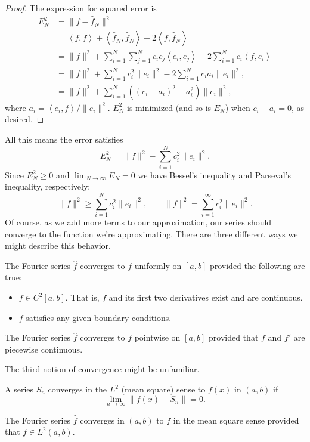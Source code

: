 \documentclass[../m180main.tex]{subfiles}
\begin{document}
\begin{proof}
    The expression for squared error is
    \begin{align*}
        E_N^2 &= \| f - \hat f_N \|^2 \\
        &= \left< f, f \right> + \left< \hat f_N, \hat f_N \right> - 2 \left< f, \hat f_N \right> \\
        &= \| f \|^2 + \sum_{i=1}^{N} \sum_{j=1}^{N} c_i c_j \left< e_i, e_j \right> - 2 \sum_{i=1}^{N} c_i \left< f, e_i \right> \\
        &= \| f \|^2 + \sum_{i=1}^{N} c_i^2 \| e_i \|^2 - 2 \sum_{i=1}^{N} c_i a_i \| e_i \|^2, \\
        &= \| f \|^2 + \sum_{i=1}^{N} \left( (c_i - a_i)^2 - a_i^2 \right) \| e_i \|^2,
    \end{align*}
    where $a_i = \left< e_i, f \right> / \| e_i \|^2$.
    $E_N^2$ is minimized (and so is $E_N$) when $c_i - a_i = 0$, as desired.
\end{proof}

All this means the error satisfies
\[ E_N^2 = \| f \|^2 - \sum_{i=1}^{N} c_i^2 \| e_i \|^2. \]
Since $E_N^2 \geq 0$ and $\lim_{N \to \infty} E_N = 0$ we have Bessel's inequality and Parseval's inequality, respectively:
\[ \| f \|^2 \geq \sum_{i=1}^{N} c_i^2 \| e_i \|^2, \qquad \| f \|^2 = \sum_{i=1}^{\infty} c_i^2 \| e_i \|^2. \]
Of course, as we add more terms to our approximation, our series should converge to the function we're approximating.
There are three different ways we might describe this behavior.

\begin{theorem}
    The Fourier series $\hat f$ converges to $f$ uniformly on $[a,b]$ provided the following are true:
    \begin{itemize}[topsep=0pt]
        \item $f \in C^2 [a,b]$.
        That is, $f$ and its first two derivatives exist and are continuous.

        \item $f$ satisfies any given boundary conditions.
    \end{itemize}
\end{theorem}

\begin{theorem}
    The Fourier series $\hat f$ converges to $f$ pointwise on $[a,b]$ provided that $f$ and $f'$ are piecewise continuous.
\end{theorem}

The third notion of convergence might be unfamiliar.

\begin{definition}[$L^2$ convergence]
    A series $S_n$ converges in the $L^2$ (mean square) sense to $f(x)$ in $(a,b)$ if
    \[ \lim_{n \to \infty} \| f(x) - S_n \| = 0. \]
\end{definition}

\begin{theorem}
    The Fourier series $\hat f$ converges in $(a,b)$ to $f$ in the mean square sense provided that $f \in L^2(a,b)$.
\end{theorem}
\end{document}
